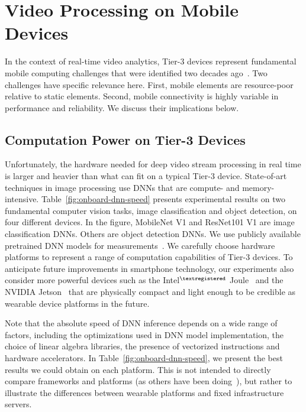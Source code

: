 \section{Video Processing on Mobile Devices}
\label{bw:challenges}

In the context of real-time video analytics, Tier-3 devices represent
fundamental mobile computing challenges that were identified two decades
ago~\cite{Satya1996}.  Two challenges have specific relevance here. First,
mobile elements are resource-poor relative to static elements.  Second, mobile
connectivity is highly variable in performance and reliability.  We discuss
their implications below.


\subsection{Computation Power on Tier-3 Devices}
\label{bw:payload}

Unfortunately, the hardware needed for deep video stream processing in real time
is larger and heavier than what can fit on a typical Tier-3 device. State-of-art
techniques in image processing use DNNs that are compute- and memory-intensive.
Table~\ref{fig:onboard-dnn-speed} presents experimental results on two
fundamental computer vision tasks, image classification and object detection, on
four different devices. In the figure, MobileNet V1 and ResNet101 V1 are image
classification DNNs. Others are object detection DNNs. We use publicly available
pretrained DNN models for measurements~\cite{tfod2019}. We carefully choose
hardware platforms to represent a range of computation capabilities of Tier-3
devices. To anticipate future improvements in smartphone technology, our
experiments also consider more powerful devices such as the
Intel$^{\tiny\textregistered}$ Joule~\cite{Hardawar2016} and the NVIDIA
Jetson~\cite{NVIDIA2017} that are physically compact and light enough to be
credible as wearable device platforms in the future.

Note that the absolute speed of DNN inference depends on a wide range of
factors, including the optimizations used in DNN model implementation, the
choice of linear algebra libraries, the presence of vectorized instructions and
hardware accelerators. In Table~\ref{fig:onboard-dnn-speed}, we present the best
results we could obtain on each platform. This is not intended to directly
compare frameworks and platforms (as others have been
doing~\cite{Zhang2018pcamp}), but rather to illustrate the differences between
wearable platforms and fixed infrastructure servers.

